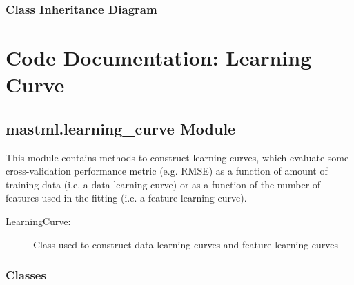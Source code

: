 \documentclass[letterpaper,10pt,english]{sphinxmanual}
\begin{document}
\subsection{Class Inheritance Diagram}
\label{\detokenize{7_hyper_opt:class-inheritance-diagram}}


\chapter{Code Documentation: Learning Curve}
\label{\detokenize{8_learning_curve:code-documentation-learning-curve}}\label{\detokenize{8_learning_curve::doc}}

\section{mastml.learning\_curve Module}
\label{\detokenize{8_learning_curve:module-mastml.learning_curve}}\label{\detokenize{8_learning_curve:mastml-learning-curve-module}}
This module contains methods to construct learning curves, which evaluate some cross-validation performance metric
(e.g. RMSE) as a function of amount of training data (i.e. a data learning curve) or as a function of the number of
features used in the fitting (i.e. a feature learning curve).
\begin{description}
\item[{LearningCurve:}] \leavevmode
Class used to construct data learning curves and feature learning curves

\end{description}


\subsection{Classes}
\label{\detokenize{8_learning_curve:classes}}
\end{document}
